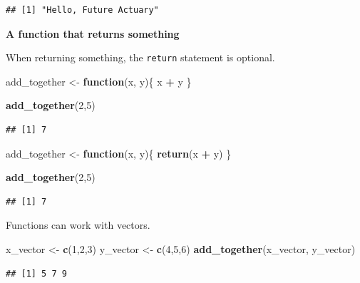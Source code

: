 \documentclass[openany]{book}
\newenvironment{Shaded}{\begin{snugshade}}{\end{snugshade}}
\newcommand{\ControlFlowTok}[1]{\textcolor[rgb]{0.13,0.29,0.53}{\textbf{#1}}}
\newcommand{\DecValTok}[1]{\textcolor[rgb]{0.00,0.00,0.81}{#1}}
\newcommand{\KeywordTok}[1]{\textcolor[rgb]{0.13,0.29,0.53}{\textbf{#1}}}
\newcommand{\NormalTok}[1]{#1}
\newcommand{\OperatorTok}[1]{\textcolor[rgb]{0.81,0.36,0.00}{\textbf{#1}}}
\newcommand{\StringTok}[1]{\textcolor[rgb]{0.31,0.60,0.02}{#1}}
\begin{document}
\begin{verbatim}
## [1] "Hello, Future Actuary"
\end{verbatim}

\textbf{A function that returns something}

When returning something, the \texttt{return} statement is optional.

\begin{Shaded}
\begin{Highlighting}[]
\NormalTok{add_together <-}\StringTok{ }\ControlFlowTok{function}\NormalTok{(x, y)\{}
\NormalTok{  x }\OperatorTok{+}\StringTok{ }\NormalTok{y}
\NormalTok{\}}

\KeywordTok{add_together}\NormalTok{(}\DecValTok{2}\NormalTok{,}\DecValTok{5}\NormalTok{)}
\end{Highlighting}
\end{Shaded}

\begin{verbatim}
## [1] 7
\end{verbatim}

\begin{Shaded}
\begin{Highlighting}[]
\NormalTok{add_together <-}\StringTok{ }\ControlFlowTok{function}\NormalTok{(x, y)\{}
  \KeywordTok{return}\NormalTok{(x }\OperatorTok{+}\StringTok{ }\NormalTok{y)}
\NormalTok{\}}

\KeywordTok{add_together}\NormalTok{(}\DecValTok{2}\NormalTok{,}\DecValTok{5}\NormalTok{)}
\end{Highlighting}
\end{Shaded}

\begin{verbatim}
## [1] 7
\end{verbatim}

Functions can work with vectors.

\begin{Shaded}
\begin{Highlighting}[]
\NormalTok{x_vector <-}\StringTok{ }\KeywordTok{c}\NormalTok{(}\DecValTok{1}\NormalTok{,}\DecValTok{2}\NormalTok{,}\DecValTok{3}\NormalTok{)}
\NormalTok{y_vector <-}\StringTok{ }\KeywordTok{c}\NormalTok{(}\DecValTok{4}\NormalTok{,}\DecValTok{5}\NormalTok{,}\DecValTok{6}\NormalTok{)}
\KeywordTok{add_together}\NormalTok{(x_vector, y_vector)}
\end{Highlighting}
\end{Shaded}

\begin{verbatim}
## [1] 5 7 9
\end{verbatim}
\end{document}
